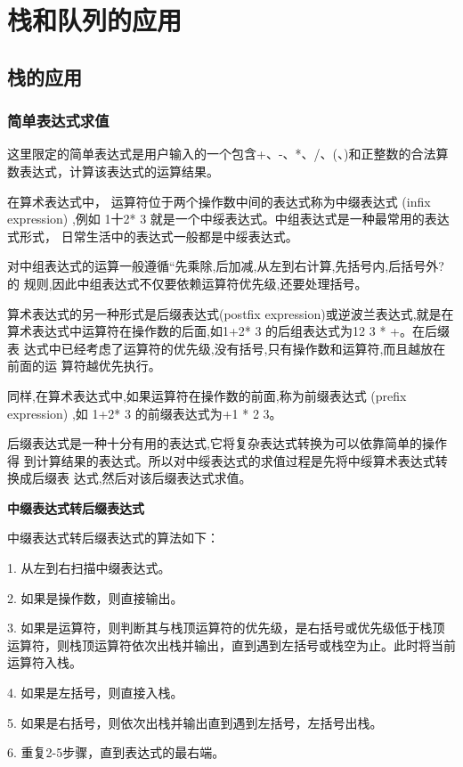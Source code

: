 \documentclass[lang=cn,newtx,10pt,scheme=chinese]{elegantbook}
\begin{document}
\section{栈和队列的应用}

\subsection{栈的应用}

\subsubsection{简单表达式求值}

这里限定的简单表达式是用户输入的一个包含+、-、*、/、(、)和正整数的合法算数表达式，计算该表达式的运算结果。

在算术表达式中， 运算符位于两个操作数中间的表达式称为中缀表达式 (infix
expression) ,例如 1十2* 3 就是一个中绥表达式。中组表达式是一种最常用的表达式形式，
日常生活中的表达式一般都是中绥表达式。

对中组表达式的运算一般遵循“先乘除,后加减,从左到右计算,先括号内,后括号外?的
规则,因此中组表达式不仅要依赖运算符优先级,还要处理括号。

算术表达式的另一种形式是后缀表达式(postfix expression)或逆波兰表达式,就是在
算术表达式中运算符在操作数的后面,如1+2* 3 的后组表达式为12 3 * +。在后缀表
达式中已经考虑了运算符的优先级,没有括号,只有操作数和运算符,而且越放在前面的运
算符越优先执行。

同样,在算术表达式中,如果运算符在操作数的前面,称为前缀表达式 (prefix
expression) ,如 1+2* 3 的前缀表达式为+1 * 2 3。

后缀表达式是一种十分有用的表达式,它将复杂表达式转换为可以依靠简单的操作得
到计算结果的表达式。所以对中绥表达式的求值过程是先将中绥算术表达式转换成后缀表
达式,然后对该后缀表达式求值。


\textbf{中缀表达式转后缀表达式}

中缀表达式转后缀表达式的算法如下：

1. 从左到右扫描中缀表达式。

2. 如果是操作数，则直接输出。

3. 如果是运算符，则判断其与栈顶运算符的优先级，是右括号或优先级低于栈顶运算符，则栈顶运算符依次出栈并输出，直到遇到左括号或栈空为止。此时将当前运算符入栈。

4. 如果是左括号，则直接入栈。

5. 如果是右括号，则依次出栈并输出直到遇到左括号，左括号出栈。

6. 重复2-5步骤，直到表达式的最右端。
\end{document}
